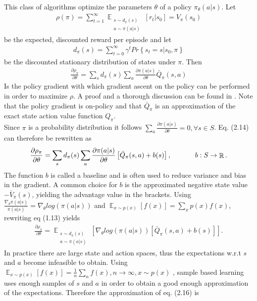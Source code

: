 This class of algorithms optimize the parameters $\theta$ of a policy $\pi_\theta(a|s)$. Let 
\begin{align}
\rho(\pi) = \sum_{t=1}^{\infty}\mathop{\mathbb{E}}_{\substack{s\sim d_\pi(s) \\ a\sim \pi(a|s)}} \left[ r_t|s_0 \right] = V_\pi(s_0)
\end{align}
be the expected, discounted reward per episode and let
\begin{align}
d_\pi(s) = \sum_{t=0}^\infty \gamma^t Pr\left\{s_t=s|s_0, \pi\right\}
\end{align}
be the discounted stationary distribution of states under $\pi$. Then
\begin{align}
\frac{\partial\rho_\pi}{\partial\theta} = \sum_s d_\pi(s)\sum_a \frac{\partial\pi(a|s)}{\partial\theta} \bar{Q}_\pi(s,a)
\end{align}
Is the policy gradient with which gradient ascent on the policy can be performed in order to maximize $\rho$. A proof and a thorough discussion can be found in \cite{PGBS}. Note that the policy gradient is on-policy and that $\bar{Q}_\pi$ is an approximation of the exact state action value function $Q_\pi$.\\
Since $\pi$ is a probability distribution it follows $\sum_a\frac{\partial\pi(a|s)}{\partial\theta}=0, \forall s \in S$. Eq. (2.14) can therefore be rewritten as
\begin{align}
\frac{\partial\rho_\pi}{\partial\theta} = \sum_s d_\pi(s)\sum_a \frac{\partial\pi(a|s)}{\partial\theta}\left[ \bar{Q}_\pi(s,a)+b(s)\right],\text{\hspace{12mm}} b:S\rightarrow \mathop{\mathbb{R}}.
\end{align}
The function $b$ is called a baseline and is often used to reduce variance and bias in the gradient. A common choice for $b$ is the approximated negative state value $-\bar{V}_{\pi}(s)$, yielding the advantage value in the brackets. Using $\frac{\nabla_\theta\pi(a|s)}{\pi(a|s)} = \nabla_\theta log(\pi(a|s))$ and $\mathop{\mathbb{E}}_{x\sim p(x)}[f(x)] = \sum_{x}p(x)f(x)$, rewriting eq (1.13) yields
\begin{align}
\frac{\partial\rho_\pi}{\partial\theta} = \mathop{\mathbb{E}}_{\substack{s\sim d_\pi(s) \\ a\sim \pi(a|s)}}\left[ \nabla_\theta log (\pi(a|s))\left[ \bar{Q}_\pi(s,a)+b(s)\right]\right].
\end{align}
In practice there are large state and action spaces, thus the expectations w.r.t $s$ and $a$ become infeasible to obtain. Using $\mathop{\mathbb{E}}_{x\sim p(x)}[f(x)] = \frac{1}{n}\sum_{n}f(x), n\rightarrow\infty, x\sim p(x)$ , sample based learning uses enough samples of $s$ and $a$ in order to obtain a good enough approximation of the expectations. Therefore the approximation of eq. (2.16) is

